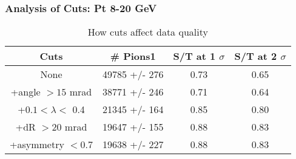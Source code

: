 \frame
{
\frametitle{Analysis of Cuts: Pt 8-20 GeV}
\begin{table}
\caption{How cuts affect data quality}
\centering
\begin{tabular}{c c c c}
\hline\hline
Cuts & \# Pions1 & S/T at 1 $\sigma$ & S/T at 2 $\sigma$ \\ [0.5ex]
\hline
None & 49785 +/-  276 & 0.73 & 0.65 \\ %
+angle $> 15$ mrad & 38771 +/-  246 & 0.71 & 0.64 \\ %
+$0.1 < \lambda <$ 0.4 & 21345 +/-  164 & 0.85 & 0.80 \\ %
+dR $> 20$ mrad & 19647 +/-  155 & 0.88 & 0.83 \\ %
+asymmetry $< 0.7$ & 19638 +/-  227 & 0.88 & 0.83 \\ %
[1ex]
\hline
\end{tabular}
\label{table:nonlin}
\end{table}
}
